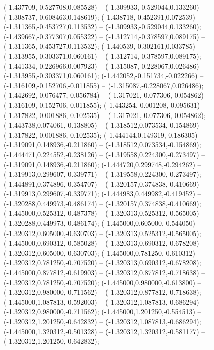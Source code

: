  (-1.437709,-0.527708,0.085528) -- (-1.309933,-0.529044,0.133260) -- (-1.308737,-0.608463,0.148619);
 (-1.438718,-0.452391,0.072539) -- (-1.311365,-0.453727,0.113532) -- (-1.309933,-0.529044,0.133260);
 (-1.439667,-0.377307,0.055322) -- (-1.312714,-0.378597,0.089175) -- (-1.311365,-0.453727,0.113532);
 (-1.440539,-0.302161,0.033785) -- (-1.313955,-0.303371,0.060161) -- (-1.312714,-0.378597,0.089175);
 (-1.441334,-0.226966,0.007923) -- (-1.315087,-0.228067,0.026486) -- (-1.313955,-0.303371,0.060161);
 (-1.442052,-0.151734,-0.022266) -- (-1.316109,-0.152706,-0.011855) -- (-1.315087,-0.228067,0.026486);
 (-1.442692,-0.076477,-0.056784) -- (-1.317021,-0.077306,-0.054862) -- (-1.316109,-0.152706,-0.011855);
 (-1.443254,-0.001208,-0.095631) -- (-1.317822,-0.001886,-0.102535) -- (-1.317021,-0.077306,-0.054862);
 (-1.443738,0.074061,-0.138805) -- (-1.318512,0.073534,-0.154869) -- (-1.317822,-0.001886,-0.102535);
 (-1.444144,0.149319,-0.186305) -- (-1.319091,0.148936,-0.211860) -- (-1.318512,0.073534,-0.154869);
 (-1.444471,0.224552,-0.238126) -- (-1.319558,0.224300,-0.273497) -- (-1.319091,0.148936,-0.211860);
 (-1.444720,0.299748,-0.294262) -- (-1.319913,0.299607,-0.339771) -- (-1.319558,0.224300,-0.273497);
 (-1.444891,0.374896,-0.354707) -- (-1.320157,0.374838,-0.410669) -- (-1.319913,0.299607,-0.339771);
 (-1.444983,0.449982,-0.419452) -- (-1.320288,0.449973,-0.486174) -- (-1.320157,0.374838,-0.410669);
 (-1.445000,0.525312,-0.487378) -- (-1.320313,0.525312,-0.565005) -- (-1.320288,0.449973,-0.486174);
 (-1.445000,0.605000,-0.544050) -- (-1.320312,0.605000,-0.630703) -- (-1.320313,0.525312,-0.565005);
 (-1.445000,0.690312,-0.585028) -- (-1.320313,0.690312,-0.678208) -- (-1.320312,0.605000,-0.630703);
 (-1.445000,0.781250,-0.610312) -- (-1.320312,0.781250,-0.707520) -- (-1.320313,0.690312,-0.678208);
 (-1.445000,0.877812,-0.619903) -- (-1.320312,0.877812,-0.718638) -- (-1.320312,0.781250,-0.707520);
 (-1.445000,0.980000,-0.613800) -- (-1.320312,0.980000,-0.711562) -- (-1.320312,0.877812,-0.718638);
 (-1.445000,1.087813,-0.592003) -- (-1.320312,1.087813,-0.686294) -- (-1.320312,0.980000,-0.711562);
 (-1.445000,1.201250,-0.554513) -- (-1.320312,1.201250,-0.642832) -- (-1.320312,1.087813,-0.686294);
 (-1.445000,1.320312,-0.501328) -- (-1.320312,1.320312,-0.581177) -- (-1.320312,1.201250,-0.642832);
